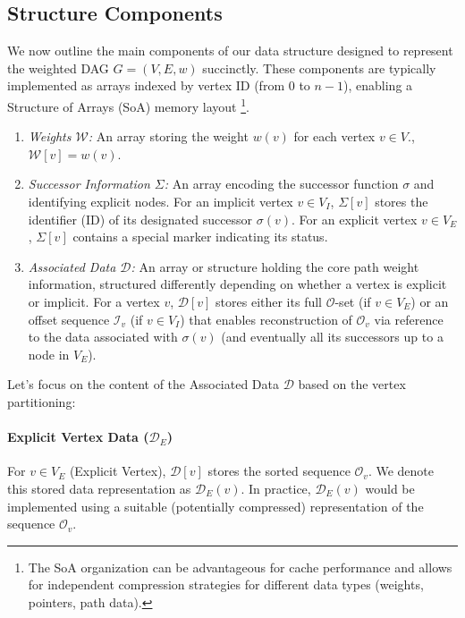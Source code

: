 \subsection{Structure Components}
\label{subsec:structure_components}

We now outline the main components of our data structure designed to represent the weighted DAG $G=(V,E,w)$ succinctly. These components are typically implemented as arrays indexed by vertex ID (from $0$ to $n-1$), enabling a Structure of Arrays (SoA) memory layout \footnote{The SoA organization can be advantageous for cache performance and allows for independent compression strategies for different data types (weights, pointers, path data).}.

\begin{enumerate}
    \item \emph{Weights $\mathcal{W}$:} An array storing the weight $w(v)$ for each vertex $v \in V$., $\mathcal{W}[v] = w(v)$.
    \item \emph{Successor Information $\Sigma$:} An array encoding the successor function $\sigma$ and identifying explicit nodes. For an implicit vertex $v \in V_I$, $\Sigma[v]$ stores the identifier (ID) of its designated successor $\sigma(v)$. For an explicit vertex $v \in V_E$, $\Sigma[v]$ contains a special marker indicating its status.
    \item \emph{Associated Data $\mathcal{D}$:} An array or structure holding the core path weight information, structured differently depending on whether a vertex is explicit or implicit. For a vertex $v$, $\mathcal{D}[v]$ stores either its full $\mathcal{O}$-set (if $v \in V_E$) or an offset sequence $\mathcal{I}_v$ (if $v \in V_I$) that enables reconstruction of $\mathcal{O}_v$ via reference to the data associated with $\sigma(v)$ (and eventually all its successors up to a node in $V_E$).
\end{enumerate}

Let's focus on the content of the Associated Data $\mathcal{D}$ based on the vertex partitioning:

\paragraph{Explicit Vertex Data ($\mathcal{D}_E$)}
For $v \in V_E$ (Explicit Vertex), $\mathcal{D}[v]$ stores the sorted sequence $\mathcal{O}_v$. We denote this stored data representation as $\mathcal{D}_E(v)$. In practice, $\mathcal{D}_E(v)$ would be implemented using a suitable (potentially compressed) representation of the sequence $\mathcal{O}_v$.

